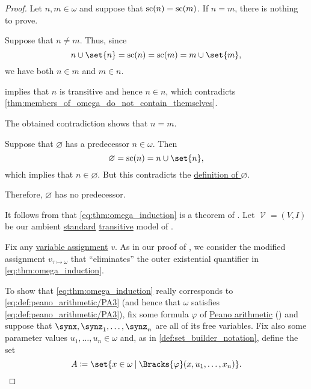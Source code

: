 \begin{proof}
   Let \( n, m \in \omega \) and suppose that \( \op{sc}(n) = \op{sc}(m) \). If \( n = m \), there is nothing to prove.

  Suppose that \( n \neq m \). Thus, since
  \begin{equation*}
    n \cup \set{ n } = \op{sc}(n) = \op{sc}(m) = m \cup \set{ m },
  \end{equation*}
  we have both \( n \in m \) and \( m \in n \).

   implies that \( n \) is transitive and hence \( n \in n \), which contradicts \cref{thm:members_of_omega_do_not_contain_themselves}.

  The obtained contradiction shows that \( n = m \).

   Suppose that \( \varnothing \) has a predecessor \( n \in \omega \). Then
  \begin{equation*}
    \varnothing = \op{sc}(n) = n \cup \set{ n },
  \end{equation*}
  which implies that \( n \in \varnothing \). But this contradicts the \hyperref[def:empty_set]{definition of \( \varnothing \)}.

  Therefore, \( \varnothing \) has no predecessor.

   It follows from  that \eqref{eq:thm:omega_induction} is a theorem of . Let \( \mscrV = (V, I) \) be our ambient \hyperref[rem:standard_model_of_set_theory]{standard} \hyperref[rem:transitive_model_of_set_theory]{transitive} model of .

  Fix any \hyperref[def:first_order_valuation/variable_assignment]{variable assignment} \( v \). As in our proof of , we consider the modified assignment \( v_{\tau \mapsto \omega} \) that \enquote{eliminates} the outer existential quantifier in \eqref{eq:thm:omega_induction}.

  To show that \eqref{eq:thm:omega_induction} really corresponds to \eqref{eq:def:peano_arithmetic/PA3} (and hence that \( \omega \) satisfies \eqref{eq:def:peano_arithmetic/PA3}), fix some formula \( \varphi \) of \hyperref[def:peano_arithmetic]{Peano arithmetic} () and suppose that \( \synx, \synz_1, \ldots, \synz_n \) are all of its free variables. Fix also some parameter values \( u_1, \ldots, u_n \in \omega \) and, as in \cref{def:set_builder_notation}, define the set
  \begin{equation*}
    A \coloneqq \set{ x \in \omega \given \Bracks{\varphi}(x, u_1, \ldots, x_n) }.
  \end{equation*}


\end{proof}
